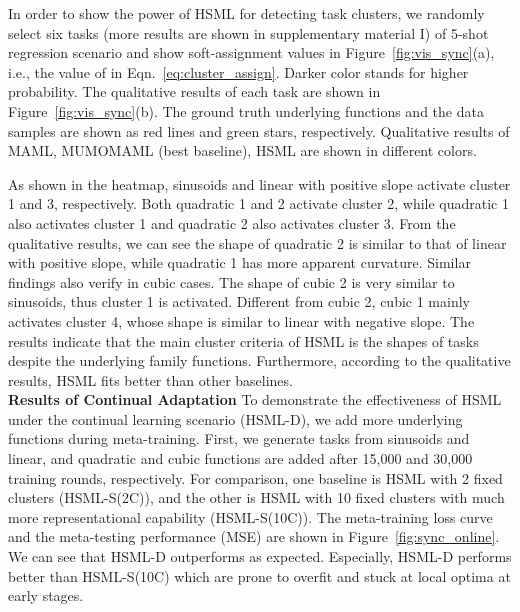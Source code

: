 \documentclass{article}
\begin{document}
In order to show the power of HSML for detecting task clusters, we randomly select six tasks (more results are shown in supplementary material I) of 5-shot regression scenario and show soft-assignment values in Figure~\ref{fig:vis_sync}(a), i.e., the value of  in Eqn.~\eqref{eq:cluster_assign}. Darker color stands for higher probability. 
The qualitative results of each task are shown in Figure~\ref{fig:vis_sync}(b). The ground truth underlying functions and the data samples  are shown as red lines and green stars, respectively. Qualitative results of MAML, MUMOMAML (best baseline), HSML are shown in different colors. 

As shown in the heatmap, sinusoids and linear with positive slope activate cluster 1 and 3, respectively. Both quadratic 1 and 2 activate cluster 2, while quadratic 1 also activates cluster 1 and quadratic 2 also activates cluster 3. From the qualitative results, we can see the shape of quadratic 2 is similar to that of linear with positive slope, while quadratic 1 has more apparent curvature. Similar findings also verify in cubic cases. The shape of cubic 2 is very similar to sinusoids, thus cluster 1 is activated. Different from cubic 2, cubic 1 mainly activates cluster 4, whose shape is similar to linear with negative slope. The results indicate that the main cluster criteria of HSML is the shapes of tasks despite the underlying family functions. Furthermore, according to the qualitative results, HSML fits better than other baselines. 
\\
\textbf{Results of Continual Adaptation} 
To demonstrate the effectiveness of HSML under the continual learning scenario (HSML-D), we add more underlying functions during meta-training. First, we generate tasks from sinusoids and linear, and quadratic and cubic functions are
added after 15,000 and 30,000 training rounds, respectively. For comparison, one baseline is HSML with 2 fixed clusters (HSML-S(2C)), and the other is HSML with 10 fixed clusters with much more representational capability (HSML-S(10C)). The meta-training loss curve and the meta-testing performance (MSE) are shown in Figure~\ref{fig:sync_online}. We can see that HSML-D outperforms as expected. Especially, HSML-D performs better than HSML-S(10C) which are prone to overfit and stuck at local optima at early stages.
\end{document}
